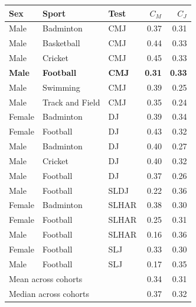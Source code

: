 \begin{tabular}{lllrr}
\toprule
Sex & Sport & Test & $C_M$ & $C_J$ \\
\midrule
Male & Badminton & CMJ & 0.37 & 0.31 \\
Male & Basketball & CMJ & 0.44 & 0.33 \\
Male & Cricket & CMJ & 0.45 & 0.33 \\
\textbf{Male} & \textbf{Football} & \textbf{CMJ} & \textbf{0.31} & \textbf{0.33} \\
Male & Swimming & CMJ & 0.39 & 0.25 \\
Male & Track and Field & CMJ & 0.35 & 0.24 \\
Female & Badminton & DJ & 0.39 & 0.34 \\
Female & Football & DJ & 0.43 & 0.32 \\
Male & Badminton & DJ & 0.40 & 0.27 \\
Male & Cricket & DJ & 0.40 & 0.32 \\
Male & Football & DJ & 0.37 & 0.26 \\
Male & Football & SLDJ & 0.22 & 0.36 \\
Female & Badminton & SLHAR & 0.38 & 0.30 \\
Female & Football & SLHAR & 0.25 & 0.31 \\
Male & Football & SLHAR & 0.16 & 0.36 \\
Female & Football & SLJ & 0.33 & 0.30 \\
Male & Football & SLJ & 0.17 & 0.35 \\
\midrule
\multicolumn{3}{l}{Mean across cohorts} & 0.34 & 0.31 \\
\multicolumn{3}{l}{Median across cohorts} & 0.37 & 0.32 \\
\bottomrule
\end{tabular}
